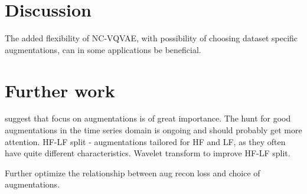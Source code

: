 \documentclass[../../thesis.tex]{subfiles}
\begin{document}




\section{Discussion}
The added flexibility of NC-VQVAE, with possibility of choosing dataset specific augmentations, can in some applications be beneficial.\newline


\section{Further work}

\cite{morningstar2024augmentations} suggest that focus on augmentations is of great importance. The hunt for good augmentations in the time series domain is ongoing and should probably get more attention.\newline
HF-LF split - augmentations tailored for HF and LF, as they often have quite different characteristics.\newline
Wavelet transform to improve HF-LF split.\newline

Further optimize the relationship between aug recon loss and choice of augmentations.\newline
\end{document}
